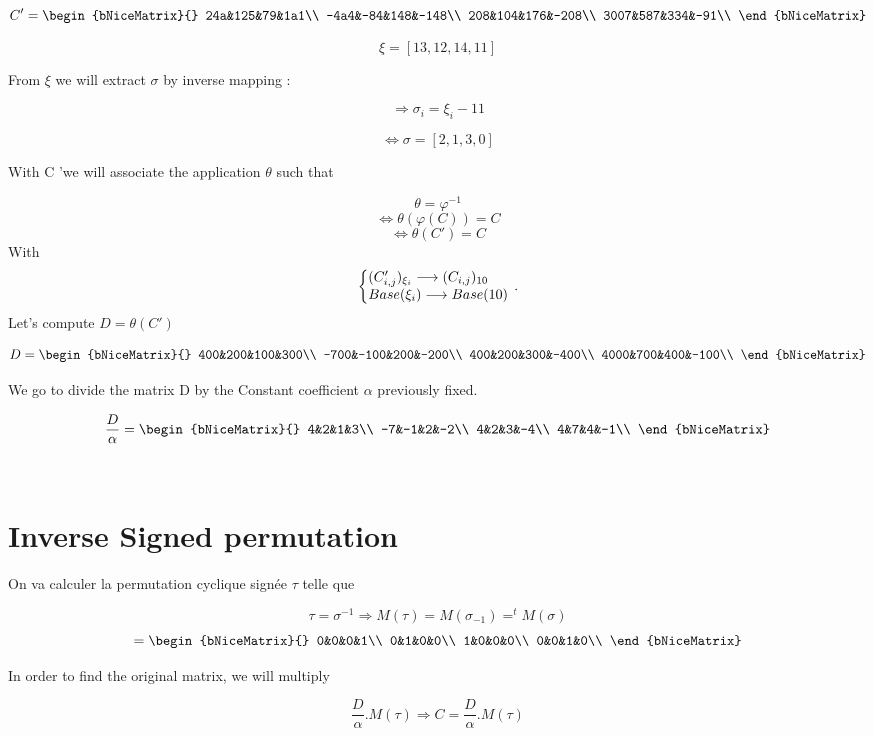 \documentclass{article}
\begin{document}
$$
C' =
\begin{bNiceMatrix}{}
24a&125&79&1a1\\
-4a4&-84&148&-148\\
208&104&176&-208\\
3007&587&334&-91\\
\end{bNiceMatrix}
$$

$$\xi = [13,12,14,11]$$

From $\xi$ we will extract $\sigma$ by inverse mapping :

$$\Longrightarrow
\boxed{
	\sigma_{i}=\xi_{i}-11
}$$

$$\iff 
\boxed{
	\sigma = [2,1,3,0]
}$$

With C 'we will associate the application $\theta$ such that

$$\theta = \varphi^{-1}$$
$$ \iff  \theta ( \varphi ( C)) = C$$
$$ \iff  \theta ( C') = C$$
With
$$
\centering
\left\{\begin{array}{@{}l@{}}
(C'_{i,j})_{\xi_{i}} \longrightarrow (C_{i,j})_{10}\\
Base(\xi_{i}) \longrightarrow Base(10)
\end{array}
\right.\,.
$$
Let's compute $D = \theta (C')$

$$
D =
\begin{bNiceMatrix}{}
400&200&100&300\\
-700&-100&200&-200\\
400&200&300&-400\\
4000&700&400&-100\\
\end{bNiceMatrix}
$$
\begin{flushleft}
We go to divide the matrix D by the Constant coefficient $\alpha$ previously fixed.
\end{flushleft}
$$
 \frac{D}{\alpha} = 
\begin{bNiceMatrix}{}
4&2&1&3\\
-7&-1&2&-2\\
4&2&3&-4\\
4&7&4&-1\\
\end{bNiceMatrix}
$$

\newpage
\
\section*{Inverse Signed permutation}
\begin{flushleft}
On va calculer la permutation cyclique signée $\tau$ telle que 
\end{flushleft}
$$\tau = \sigma^{-1} \Longrightarrow M(\tau)=M(\sigma_{-1})=^{t}M(\sigma)$$
$$=
\begin{bNiceMatrix}{}
0&0&0&1\\
0&1&0&0\\
1&0&0&0\\
0&0&1&0\\
\end{bNiceMatrix}
$$
\begin{flushleft}
In order to find the original matrix, we will multiply 
\end{flushleft}
$$\frac{D}{\alpha}.M(\tau) \Longrightarrow
\boxed{
C=\frac{D}{\alpha}.M(\tau)
}$$
\end{document}
